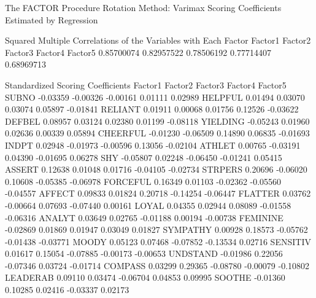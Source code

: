 \documentclass{article}
\begin{document}
\begin{Woutput}
The FACTOR Procedure
Rotation Method: Varimax
Scoring Coefficients Estimated by Regression

      Squared Multiple Correlations of the Variables with Each Factor
   Factor1         Factor2         Factor3         Factor4         Factor5
0.85700074      0.82957522      0.78506192      0.77714407      0.68969713

                           Standardized Scoring Coefficients
                 Factor1         Factor2         Factor3         Factor4         Factor5
SUBNO           -0.03359        -0.00326        -0.00161         0.01111         0.02989
HELPFUL          0.01494         0.03070         0.03074         0.05897        -0.01841
RELIANT          0.01911         0.00068         0.01756         0.12526        -0.03622
DEFBEL           0.08957         0.03124         0.02380         0.01199        -0.08118
YIELDING        -0.05243         0.01960         0.02636         0.00339         0.05894
CHEERFUL        -0.01230        -0.06509         0.14890         0.06835        -0.01693
INDPT            0.02948        -0.01973        -0.00596         0.13056        -0.02104
ATHLET           0.00765        -0.03191         0.04390        -0.01695         0.06278
SHY             -0.05807         0.02248        -0.06450        -0.01241         0.05415
ASSERT           0.12638         0.01048         0.01716        -0.04105        -0.02734
STRPERS          0.20696        -0.06020         0.10608        -0.05385        -0.06978
FORCEFUL         0.16349         0.01103        -0.02362        -0.05560        -0.04557
AFFECT           0.09833         0.01824         0.20718        -0.14254        -0.06447
FLATTER          0.03762        -0.00664         0.07693        -0.07440         0.00161
LOYAL            0.04355         0.02944         0.08089        -0.01558        -0.06316
ANALYT           0.03649         0.02765        -0.01188         0.00194        -0.00738
FEMININE        -0.02869         0.01869         0.01947         0.03049         0.01827
SYMPATHY         0.00928         0.18573        -0.05762        -0.01438        -0.03771
MOODY            0.05123         0.07468        -0.07852        -0.13534         0.02716
SENSITIV         0.01617         0.15054        -0.07885        -0.00173        -0.00653
UNDSTAND        -0.01986         0.22056        -0.07346         0.03724        -0.01714
COMPASS          0.03299         0.29365        -0.08780        -0.00079        -0.10802
LEADERAB         0.09110         0.03474        -0.06704         0.04853         0.09995
SOOTHE          -0.01360         0.10285         0.02416        -0.03337         0.02173

\end{Woutput}
\end{document}
